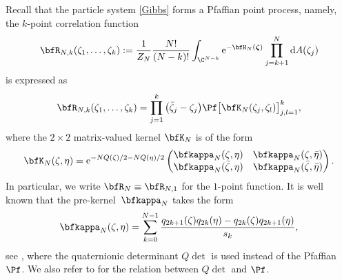 Recall that the particle system \eqref{Gibbs} forms a Pfaffian point process, namely, the $k$-point correlation function
\begin{gather} \label{bfRNk def}
	\bfR_{N,k}(\zeta_1,\dots,\zeta_k):=\frac{1}{Z_N} \frac{N!}{(N-k)!} \int_{ \C^{N-k} } {\rm e}^{- \bfH_N( \boldsymbol{\zeta} ) } \prod_{j=k+1}^N {\rm d}A(\zeta_j)
\end{gather}
is expressed as
\begin{gather} \label{bfRNk Pf}
	\bfR_{N,k}(\zeta_1,\dots, \zeta_k)= \prod_{j=1}^{k} \big(\bar{\zeta}_j-\zeta_j\big) \Pf \big[ \bfK_{N}(\zeta_j,\zeta_l) \big]_{ j,l=1 }^k,
\end{gather}
where the $2 \times 2$ matrix-valued kernel $\bfK_N$ is of the form
\begin{gather} \label{bfK Pf}
	\bfK_N(\zeta,\eta)={\rm e}^{ -NQ(\zeta)/2-NQ(\eta)/2 }
	\begin{pmatrix}
		\bfkappa_N(\zeta,\eta) & \bfkappa_N(\zeta,\bar{\eta}) \\
		\bfkappa_N(\bar{\zeta},\eta) & \bfkappa_N(\bar{\zeta},\bar{\eta})
	\end{pmatrix}.
\end{gather}
In particular, we write $\bfR_{N} \equiv \bfR_{N,1}$ for the $1$-point function.
It is well known that the pre-kernel~$\bfkappa_N$ takes the form
\begin{gather} \label{bfkappaN}
	\bfkappa_N(\zeta,\eta)=\sum_{k=0}^{N-1} \frac{q_{2k+1}(\zeta) q_{2k}(\eta) -q_{2k}(\zeta) q_{2k+1}(\eta)}{s_k},
\end{gather}
see \cite{MR1928853}, where the quaternionic determinant $Q\det$ is used instead of the Pfaffian $\Pf$. We also refer to \cite{Mehta} for the relation between $Q\det$ and $\Pf$.

